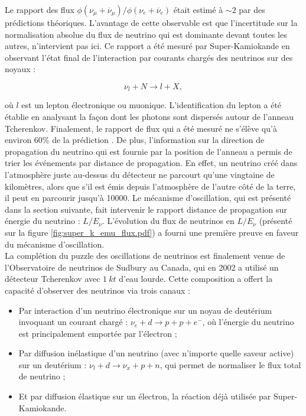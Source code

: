 \bigbreak

Le rapport des flux $\phi(\nu_\mu + \overline{\nu}_\mu)/\phi(\nu_e + \overline{\nu}_e)$ était estimé à $\sim 2$ par des prédictions théoriques. L'avantage de cette observable est que l'incertitude sur la normalisation absolue du flux de neutrino qui est dominante devant toutes les autres, n'intervient pas ici. Ce rapport a été mesuré par Super-Kamiokande en observant l'état final de l'interaction par courants chargés des neutrinos sur des noyaux :

\begin{equation}
    \nu_l + N \rightarrow l + X,
\end{equation}

\bigbreak

\noindent
où $l$ est un lepton électronique ou muonique. L'identification du lepton a été établie en analysant la façon dont les photons sont dispersés autour de l'anneau Tcherenkov. Finalement, le rapport de flux qui a été mesuré ne s'élève qu'à environ 60\% de la prédiction \cite{Fukuda:1998mi}. De plus, l'information sur la direction de propagation du neutrino qui est fournie par la position de l'anneau a permis de trier les événements par distance de propagation. En effet, un neutrino créé dans l'atmosphère juste au-dessus du détecteur ne parcourt qu'une vingtaine de kilomètres, alors que s'il est émis depuis l'atmosphère de l'autre côté de la terre, il peut en parcourir jusqu'à 10000. Le mécanisme d'oscillation, qui est présenté dans la section suivante, fait intervenir le rapport distance de propagation sur énergie du neutrino : $L/E_\nu$. L'évolution du flux de neutrinos en $L/E_\nu$ (présenté sur la figure \ref{fig:super_k_emu_flux.pdf}) a fourni une première preuve en faveur du mécanisme d'oscillation.\\

La complétion du puzzle des oscillations de neutrinos est finalement venue de l'Observatoire de neutrinos de Sudbury au Canada, qui en 2002 a utilisé un détecteur Tcherenkov avec $\SI{1}{kt}$ d'eau lourde. Cette composition a offert la capacité d'observer des neutrinos via trois canaux :

\begin{itemize}[label=\textbullet]
    \item Par interaction d'un neutrino électronique sur un noyau de deutérium invoquant un courant chargé : $\nu_e + d \rightarrow p + p + e^-$, où l'énergie du neutrino est principalement emportée par l'électron ;
    \item Par diffusion inélastique d'un neutrino (avec n'importe quelle saveur active) sur un deutérium : $\nu_l + d \rightarrow \nu_x + p + n$, qui permet de normaliser le flux total de neutrino ;
    \item Et par diffusion élastique sur un électron, la réaction déjà utilisée par Super-Kamiokande.\\
\end{itemize}

